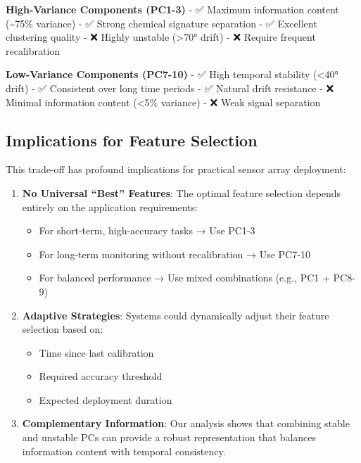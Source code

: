 \documentclass[
  letterpaper,
  DIV=11,
  numbers=noendperiod]{scrartcl}
\providecommand{\tightlist}{%
  \setlength{\itemsep}{0pt}\setlength{\parskip}{0pt}}
\begin{document}
\textbf{High-Variance Components (PC1-3)} - ✅ Maximum information
content (\textasciitilde75\% variance) - ✅ Strong chemical signature
separation - ✅ Excellent clustering quality - ❌ Highly unstable
(\textgreater70° drift) - ❌ Require frequent recalibration

\textbf{Low-Variance Components (PC7-10)} - ✅ High temporal stability
(\textless40° drift) - ✅ Consistent over long time periods - ✅ Natural
drift resistance - ❌ Minimal information content (\textless5\%
variance) - ❌ Weak signal separation

\subsection{Implications for Feature
Selection}\label{implications-for-feature-selection}

This trade-off has profound implications for practical sensor array
deployment:

\begin{enumerate}
\def\labelenumi{\arabic{enumi}.}
\tightlist
\item
  \textbf{No Universal ``Best'' Features}: The optimal feature selection
  depends entirely on the application requirements:

  \begin{itemize}
  \tightlist
  \item
    For short-term, high-accuracy tasks → Use PC1-3
  \item
    For long-term monitoring without recalibration → Use PC7-10
  \item
    For balanced performance → Use mixed combinations (e.g., PC1 +
    PC8-9)
  \end{itemize}
\item
  \textbf{Adaptive Strategies}: Systems could dynamically adjust their
  feature selection based on:

  \begin{itemize}
  \tightlist
  \item
    Time since last calibration
  \item
    Required accuracy threshold
  \item
    Expected deployment duration
  \end{itemize}
\item
  \textbf{Complementary Information}: Our analysis shows that combining
  stable and unstable PCs can provide a robust representation that
  balances information content with temporal consistency.
\end{enumerate}
\end{document}
